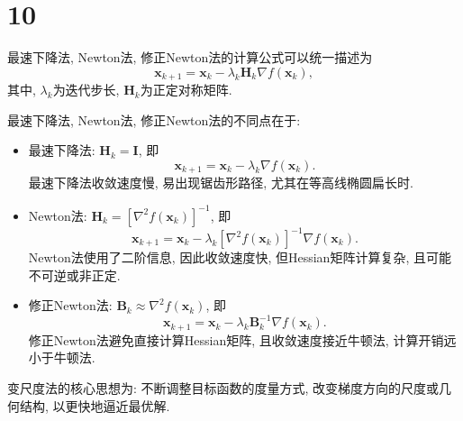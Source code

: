 \section*{10}

最速下降法, Newton法, 修正Newton法的计算公式可以统一描述为
\begin{equation*}
    \bm{x}_{k+1}=\bm{x}_k-\lambda_k\bm{H}_k\nabla f(\bm{x}_k),
\end{equation*}
其中, $\lambda_k$为迭代步长, $\bm{H}_k$为正定对称矩阵.

最速下降法, Newton法, 修正Newton法的不同点在于:
\begin{itemize}
    \item 最速下降法: $\bm{H}_k=\bm{I}$, 即
        \begin{equation*}
            \bm{x}_{k+1}=\bm{x}_k-\lambda_k\nabla f(\bm{x}_k).
        \end{equation*}
        最速下降法收敛速度慢, 易出现锯齿形路径, 尤其在等高线椭圆扁长时.

    \item Newton法: $\bm{H}_k=\left[\nabla^2 f(\bm{x}_k)\right]^{-1}$, 即
        \begin{equation*}
            \bm{x}_{k+1}=\bm{x}_k-\lambda_k\left[\nabla^2 f(\bm{x}_k)\right]^{-1}\nabla f(\bm{x}_k).
        \end{equation*}
        Newton法使用了二阶信息, 因此收敛速度快, 但Hessian矩阵计算复杂, 且可能不可逆或非正定.

    \item 修正Newton法: $\bm{B}_k\approx\nabla^2 f(\bm{x}_k)$, 即
        \begin{equation*}
            \bm{x}_{k+1}=\bm{x}_k-\lambda_k\bm{B}_k^{-1}\nabla f(\bm{x}_k).
        \end{equation*}
        修正Newton法避免直接计算Hessian矩阵, 且收敛速度接近牛顿法, 计算开销远小于牛顿法.
\end{itemize}

变尺度法的核心思想为: 不断调整目标函数的度量方式, 改变梯度方向的尺度或几何结构, 以更快地逼近最优解.
